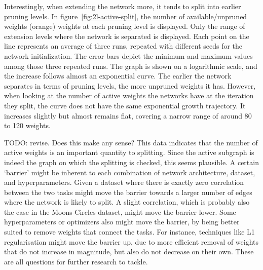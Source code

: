 Interestingly, when extending the network more, it tends to split into earlier pruning levels.
In figure~\ref{fig:2l-active-split}, the number of available/unpruned weights (orange) weights at each pruning level is displayed.
Only the range of extension levels where the network is separated is displayed.
Each point on the line represents an average of three runs, repeated with different seeds for the network initialization.
The error bars depict the minimum and maximum values among those three repeated runs.
The graph is shown on a logarithmic scale, and the increase follows almost an exponential curve.
The earlier the network separates in terms of pruning levels, the more unpruned weights it has.
However, when looking at the number of active weights the networks have at the iteration they split, the curve does not have the same exponential growth trajectory.
It increases slightly but almost remains flat, covering a narrow range of around 80 to 120 weights.

TODO: revise. Does this make any sense?
This data indicates that the number of active weights is an important quantity to splitting.
Since the active subgraph is indeed the graph on which the splitting is checked, this seems plausible.
A certain `barrier' might be inherent to each combination of network architecture, dataset, and hyperparameters.
Given a dataset where there is exactly zero correlation between the two tasks might move the barrier towards a larger number of edges where the network is likely to split.
A slight correlation, which is probably also the case in the Moons-Circles dataset, might move the barrier lower.
Some hyperparameters or optimizers also might move the barrier, by being better suited to remove weights that connect the tasks.
For instance, techniques like L1 regularisation might move the barrier up, due to more efficient removal of weights that do not increase in magnitude, but also do not decrease on their own.
These are all questions for further research to tackle.
 

